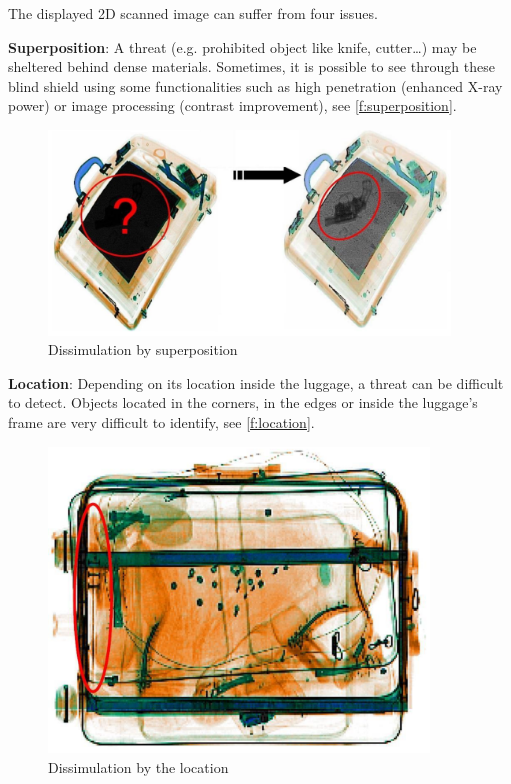 The displayed 2D scanned image can suffer from four issues.

\textbf{Superposition}: A threat (e.g. prohibited object like knife, cutter…) may be sheltered behind dense materials. Sometimes, it is possible to see through these blind shield using some functionalities such as high penetration (enhanced X-ray power) or image processing (contrast improvement),  see  \autoref{f:superposition}. 
\begin{figure}
\centering
	\includegraphics[width=0.95\textwidth]{Figures/superposition}
	\caption{Dissimulation by superposition}
	\label{f:superposition}
\end{figure}

\textbf{Location}: Depending on its location inside the luggage, a threat can be difficult to detect. Objects located in the corners, in the edges or inside the luggage's frame are very difficult to identify,  see  \autoref{f:location}.
\begin{figure}
\centering
	\includegraphics[width=0.9\textwidth]{Figures/positioning}
	\caption{Dissimulation by the location}
	\label{f:location}
\end{figure}

